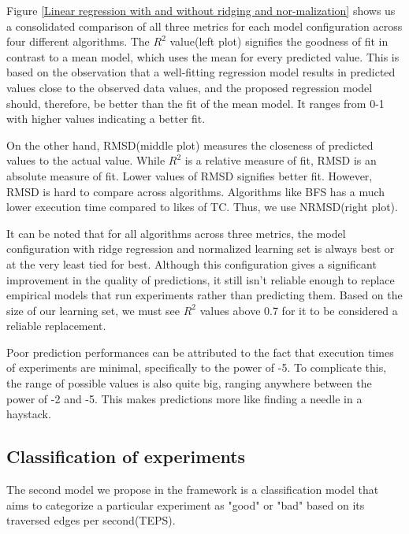 Figure \ref{Linear regression with and without ridging and nor-malization} shows us a consolidated comparison of all three metrics for each model configuration across four different algorithms. The $R^2$ value(left plot) signifies the goodness of fit in contrast to a mean model, which uses the mean for every predicted value. This is based on the observation that a well-fitting regression model results in predicted values close to the observed data values, and the proposed regression model should, therefore, be better than the fit of the mean model. It ranges from 0-1 with higher values indicating a better fit. 

On the other hand, RMSD(middle plot) measures the closeness of predicted values to the actual value. While $R^2$ is a relative measure of fit, RMSD is an absolute measure of fit. Lower values of RMSD signifies better fit. However, RMSD is hard to compare across algorithms. Algorithms like BFS has a much lower execution time compared to likes of TC. Thus, we use NRMSD(right plot).

It can be noted that for all algorithms across three metrics, the model configuration with ridge regression and normalized learning set is always best or at the very least tied for best. Although this configuration gives a significant improvement in the quality of predictions, it still isn't reliable enough to replace empirical models that run experiments rather than predicting them. Based on the size of our learning set, we must see  $R^2$ values above 0.7 for it to be considered a reliable replacement. 

Poor prediction performances can be attributed to the fact that execution times of experiments are minimal, specifically to the power of -5. To complicate this, the range of possible values is also quite big, ranging anywhere between the power of -2 and -5. This makes predictions more like finding a needle in a haystack.

\subsection{Classification of experiments}
The second model we propose in the framework is a classification model that aims to categorize a particular experiment as "good" or "bad" based on its traversed edges per second(TEPS).   

